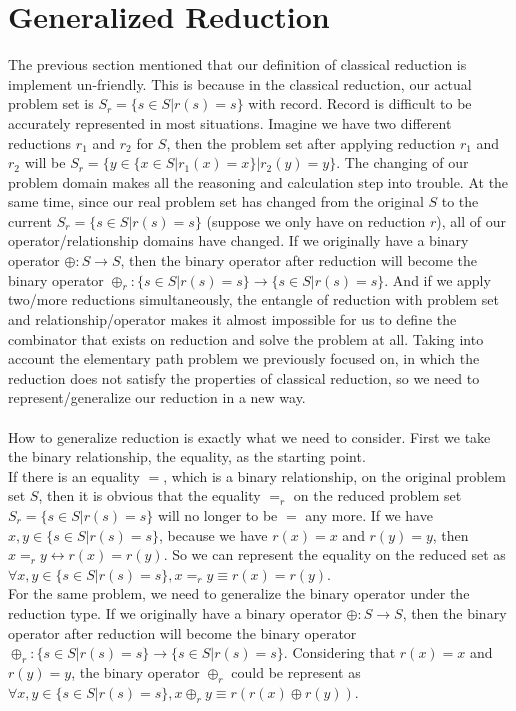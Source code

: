 \documentclass[a4paper,10pt]{article}
\begin{document}
\section{Generalized Reduction}
The previous section mentioned that our definition of classical reduction is implement un-friendly.
This is because in the classical reduction, our actual problem set is $S_r = \{s\in S|r(s)= s\}$ with record. Record is difficult to be accurately represented in most situations. 
Imagine we have two different reductions $r_1$ and $r_2$ for $S$, then the problem set after applying reduction $r_1$ and $r_2$ will be $S_r = \{y\in \{x \in S | r_1(x) = x\}|r_2(y)= y\}$. 
The changing of our problem domain makes all the reasoning and calculation step into trouble. 
At the same time, since our real problem set has changed from the original $S$ to the current $S_r = \{s\in S|r(s)= s\}$ (suppose we only have on reduction $r$), all of our operator/relationship domains have changed. If we originally have a binary operator $\oplus : S \rightarrow S$, then the binary operator after reduction will become the binary operator $\oplus_r : \{s\in S|r(s)= s\} \rightarrow \{s\in S|r(s)= s\}$. And if we apply two/more reductions simultaneously, the entangle of reduction with problem set and relationship/operator makes it almost impossible for us to define the combinator that exists on reduction and solve the problem at all. 
Taking into account the elementary path problem we previously focused on, in which the reduction does not satisfy the properties of classical reduction, so we need to represent/generalize our reduction in a new way.\\\\
How to generalize reduction is exactly what we need to consider.
First we take the binary relationship, the equality, as the starting point.\\
If there is an equality $=$, which is a binary relationship, on the original problem set $S$, then it is obvious that the equality $=_r$ on the reduced problem set  $S_r = \{s\in S|r(s)= s\}$ will no longer to be $=$ any more. If we have $x,y \in \{s\in S|r(s)= s\}$, because we have $r(x) =x$ and $r(y) = y$, then $x =_r y \leftrightarrow r(x) = r(y)$. So we can represent the equality on the reduced set as $\forall x,y \in \{s\in S|r(s)= s\}, x =_r y \equiv r(x) = r(y)$.\\
For the same problem, we need to generalize the binary operator under the reduction type.
If we originally have a binary operator $\oplus : S \rightarrow S$, then the binary operator after reduction will become the binary operator $\oplus_r : \{s\in S|r(s)= s\} \rightarrow \{s\in S|r(s)= s\}$. Considering that $r(x) =x$ and $r(y) = y$, the binary operator $\oplus_r$ could be represent as $\forall x,y \in \{s\in S|r(s)= s\}, x \oplus_r y \equiv r(r(x) \oplus r(y))$.\\\\
\end{document}
